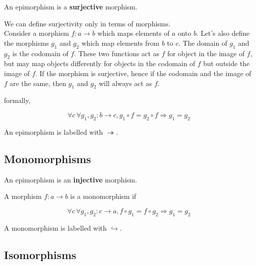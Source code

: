 \documentclass{article}
\begin{document}
An epimorphism is a \textbf{surjective} morphism.

We can define surjectivity only in terms of morphisms.
\\
Consider a morphism \(f: a \rightarrow b\) which maps elements of \(a\) onto \(b\).
Let's also define the morphisms \(g_1\) and \(g_2\) which map elements from \(b\) to \(c\).
The domain of \(g_1\) and \(g_2\) is the codomain of \(f\). These two functions act
as \(f\) for object in the image of \(f\), but may map objects differently
for objects in the codomain of \(f\) but outside the image of \(f\).
If the morphism is surjective, hence if the codomain and the image of \(f\) are the same,
then \(g_1\) and \(g_2\) will always act as \(f\).

\begin{center}
\end{center}

formally,

\[
    \forall c\, \forall g_1, g_2 : b \rightarrow c, g_1 \circ f = g_2 \circ f \Rightarrow g_1 = g_2
\]

An epimorphism is labelled with \(\twoheadrightarrow\).

\subsection{Monomorphisms}

An epimorphism is an \textbf{injective} morphism.

\begin{center}
\end{center}

A morphism \(f: a \rightarrow b\) is a monomorphism if

\[
    \forall c\, \forall g_1, g_2: c \rightarrow a, 
    f \circ g_1 = f \circ g_2 \Rightarrow g_1 = g_2
\]

A monomorphism is labelled with \(\hookrightarrow\).

\subsection{Isomorphisms}
\end{document}
